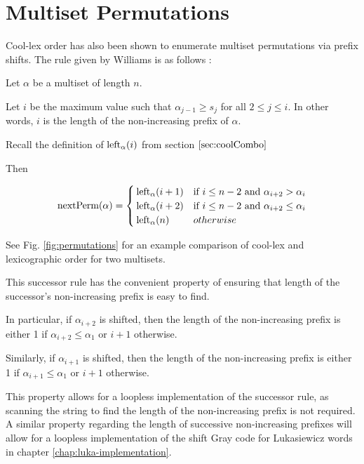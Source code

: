 \section{Multiset Permutations}

Cool-lex order has also been shown to enumerate multiset permutations via prefix shifts.  The rule given by Williams is as follows \cite{williams2009loopless}:

 Let $\alpha$ be a multiset of length $n$.

 Let $i$ be the maximum value such that $\alpha_{j-1} \ge s_j$ for all $2 \le j \le i$.  In other words, $i$ is the length of the non-increasing prefix of $\alpha$.  

Recall the definition of $\leftshift[\alpha]{i}$ from section $\ref{sec:coolCombo}$



Then

\begin{equation*}
    \text{nextPerm}(\alpha) = \begin{cases}
	\leftshift[\alpha]{i+1} & \text{if $i \le n-2$ and $\alpha_{i+2} > \alpha_i$}\\
	\leftshift[\alpha]{i+2} & \text{if $i \le n-2$ and $\alpha_{i+2} \le \alpha_i$}\\
	\leftshift[\alpha]{n} & otherwise\\
\end{cases}
\end{equation*}


See Fig. \ref{fig:permutations} for an example comparison of cool-lex and lexicographic order for two multisets.

This successor rule has the convenient property of ensuring that length of the successor's non-increasing prefix is easy to find.

In particular, if $\alpha_{i+2}$ is shifted, then the length of the non-increasing prefix is either 1 if $\alpha_{i+2}\le \alpha_1$ or $i+1$ otherwise. 

Similarly, if $\alpha_{i+1}$ is shifted, then the length of the non-increasing prefix is either 1 if $\alpha_{i+1}\le \alpha_1$ or $i+1$ otherwise. 


This property allows for a loopless implementation of the successor rule, as scanning the string to find the length of the non-increasing prefix is not required.  
A similar property regarding the length of successive non-increasing prefixes will allow for a loopless implementation of the shift Gray code for Lukasiewicz words in chapter \ref{chap:luka-implementation}.

